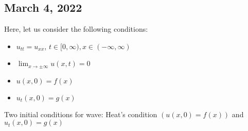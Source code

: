\subsection{March 4, 2022}


Here, let us consider the following conditions:
%
\begin{itemize}
  \item $u_{tt} = u_{xx}$, $t \in [0, \infty), x \in (-\infty, \infty)$
  \item $\displaystyle \lim_{x \to \pm \infty} u(x, t) = 0$
  \item $u(x, 0) = f(x)$
  \item $u_t(x, 0) = g(x)$
\end{itemize}

\note Two initial conditions for wave: Heat's condition $(u(x, 0) = f(x))$ and $u_t(x, 0) = g(x)$

